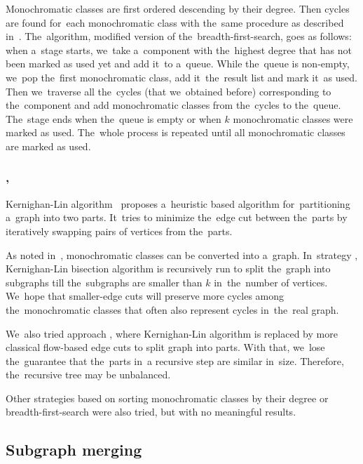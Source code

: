 Monochromatic classes are first ordered descending by their degree.
Then cycles are found for~each monochromatic class with the~same procedure
as described in~.
The~algorithm, modified version of the~breadth-first-search, goes as follows:
when a~stage starts, we~take a~component with the~highest degree
that has not been marked as used yet and add it~to a~queue.
While the~queue is non-empty, we~pop the~first monochromatic class,
add it~the~result list and mark it~as used.
Then we~traverse all the~cycles (that we~obtained before)
corresponding to the~component
and add monochromatic classes from the~cycles to the~queue.
The~stage ends when the~queue is empty or when \( k \) monochromatic classes
were marked as used. The~whole process is repeated until
all monochromatic classes are marked as used.

\subsubsection*{\KernighanLin{}, \Cuts{}}

Kernighan-Lin algorithm~\cite{kernighan_lin} proposes a~heuristic based algorithm
for~partitioning a~graph into two parts. It~tries to minimize the~edge cut between
the~parts by iteratively swapping pairs of vertices from the~parts.

As noted in~,
monochromatic classes can be converted into a~graph.
In~strategy \KernighanLin{},
Kernighan-Lin bisection algorithm is recursively run to split the~graph
into subgraphs till the~subgraphs are smaller than \( k \) in~the~number of vertices.
We~hope that smaller-edge cuts will preserve more cycles among
the~monochromatic classes that often also represent cycles in~the~real graph.

We~also tried approach \Cuts{}, where Kernighan-Lin algorithm is replaced by
more classical flow-based edge cuts to split graph into parts.
With that, we~lose the~guarantee that the~parts in~a recursive step
are similar in~size. Therefore, the~recursive tree may be unbalanced.

Other strategies based on
sorting monochromatic classes by their degree
or breadth-first-search were also tried,
but with no meaningful results.



\subsection{Subgraph merging}%
\label{sec:merging}

